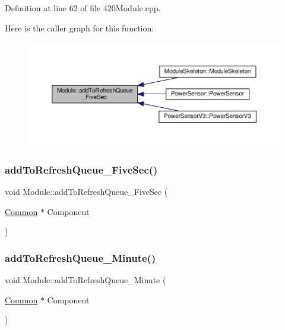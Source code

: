 Definition at line 62 of file 420\+Module.\+cpp.

Here is the caller graph for this function\+:
\nopagebreak
\begin{figure}[H]
\begin{center}
\leavevmode
\includegraphics[width=350pt]{class_module_a2dffaa526893d852b722cf890a6821c6_icgraph}
\end{center}
\end{figure}
\mbox{\label{class_module_a2dffaa526893d852b722cf890a6821c6}} 
\subsubsection{\texorpdfstring{add\+To\+Refresh\+Queue\+\_\+\+Five\+Sec()}{addToRefreshQueue\_FiveSec()}\hspace{0.1cm}{\footnotesize\ttfamily [2/2]}}
{\footnotesize\ttfamily void Module\+::add\+To\+Refresh\+Queue\+\_\+\+Five\+Sec (\begin{DoxyParamCaption}\item[{\hyperlink{class_common}{Common} $\ast$}]{Component }\end{DoxyParamCaption})}

\mbox{\label{class_module_a20d1125116f9a8c71339fde4626c5adb}} 
\subsubsection{\texorpdfstring{add\+To\+Refresh\+Queue\+\_\+\+Minute()}{addToRefreshQueue\_Minute()}\hspace{0.1cm}{\footnotesize\ttfamily [1/2]}}
{\footnotesize\ttfamily void Module\+::add\+To\+Refresh\+Queue\+\_\+\+Minute (\begin{DoxyParamCaption}\item[{\hyperlink{class_common}{Common} $\ast$}]{Component }\end{DoxyParamCaption})}



